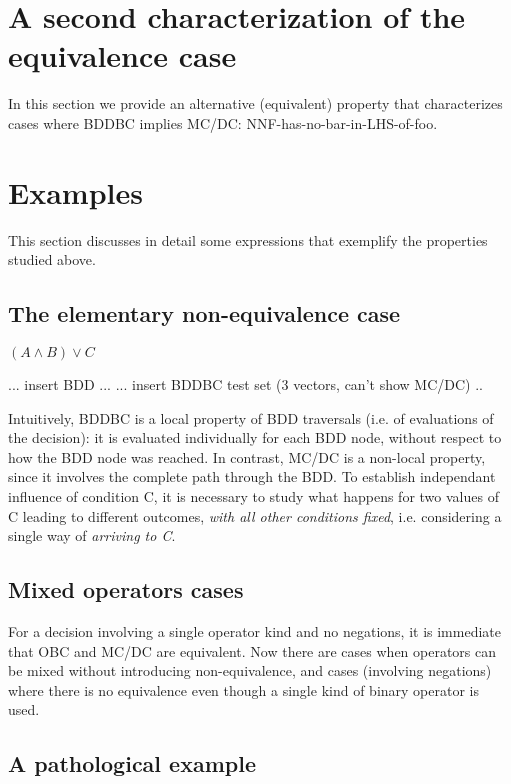 \documentclass[a4paper,12pt,twoside]{article}
\begin{document}
\section{A second characterization of the equivalence case}

In this section we provide an alternative (equivalent) property
that characterizes cases where BDDBC implies MC/DC:
NNF-has-no-bar-in-LHS-of-foo.

\section{Examples}

This section discusses in detail some expressions that exemplify the properties
studied above.

\subsection{The elementary non-equivalence case}

$(A \land B) \lor C$

... insert BDD ...
... insert BDDBC test set (3 vectors, can't show MC/DC) ..

Intuitively, BDDBC is a local property of BDD traversals (i.e. of evaluations
of the decision): it is evaluated individually for each BDD node, without
respect to how the BDD node was reached. In contrast, MC/DC is a non-local
property, since it involves the complete path through the BDD. To establish
independant influence of condition C, it is necessary to study what happens
for two values of C leading to different outcomes, \emph{with all other
conditions fixed}, i.e. considering a single way of \emph{arriving to C}.

\subsection{Mixed operators cases}

For a decision involving a single operator kind and no negations, it is
immediate that OBC and MC/DC are equivalent. Now there are cases when
operators can be mixed without introducing non-equivalence, and cases
(involving negations) where there is no equivalence even though a single
kind of binary operator is used.

\subsection{A pathological example}
\end{document}
